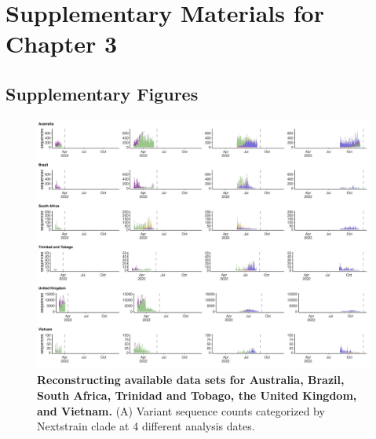 \graphicspath{{./chapters/ncov-forecasting-fit/}}
\chapter{Supplementary Materials for Chapter 3} 

\section{Supplementary Figures}


%

\begin{figure}[th!]
	\centering
	\includegraphics[width=0.9\textwidth=0.01]{supp_figures/Supplementary_Fig_1A.png}
	\caption[\textbf{Reconstructing available data sets for Australia, Brazil, South Africa, Trinidad and Tobago, the United Kingdom, and Vietnam.}]{
		\textbf{Reconstructing available data sets for Australia, Brazil, South Africa, Trinidad and Tobago, the United Kingdom, and Vietnam.}
		(A) Variant sequence counts categorized by Nextstrain clade at 4 different analysis dates.
	}
	\label{fig:S1}
\end{figure}

